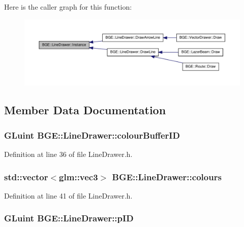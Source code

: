 Here is the caller graph for this function\-:
\nopagebreak
\begin{figure}[H]
\begin{center}
\leavevmode
\includegraphics[width=350pt]{class_b_g_e_1_1_line_drawer_aae06b335f9d123ccd8162c914d4461dc_icgraph}
\end{center}
\end{figure}




\subsection{Member Data Documentation}
\hypertarget{class_b_g_e_1_1_line_drawer_a46d0baf0ded68d67d4fce17664d4507c}{
\subsubsection[{colour\-Buffer\-I\-D}]{\setlength{\rightskip}{0pt plus 5cm}G\-Luint B\-G\-E\-::\-Line\-Drawer\-::colour\-Buffer\-I\-D}}\label{class_b_g_e_1_1_line_drawer_a46d0baf0ded68d67d4fce17664d4507c}


Definition at line 36 of file Line\-Drawer.\-h.

\hypertarget{class_b_g_e_1_1_line_drawer_ac5d36287f4b653d18900b7d933b3a690}{
\subsubsection[{colours}]{\setlength{\rightskip}{0pt plus 5cm}std\-::vector$<$glm\-::vec3$>$ B\-G\-E\-::\-Line\-Drawer\-::colours}}\label{class_b_g_e_1_1_line_drawer_ac5d36287f4b653d18900b7d933b3a690}


Definition at line 41 of file Line\-Drawer.\-h.

\hypertarget{class_b_g_e_1_1_line_drawer_a5f2071f6da0a96173105a0f3da00f2a8}{
\subsubsection[{p\-I\-D}]{\setlength{\rightskip}{0pt plus 5cm}G\-Luint B\-G\-E\-::\-Line\-Drawer\-::p\-I\-D}}\label{class_b_g_e_1_1_line_drawer_a5f2071f6da0a96173105a0f3da00f2a8}


